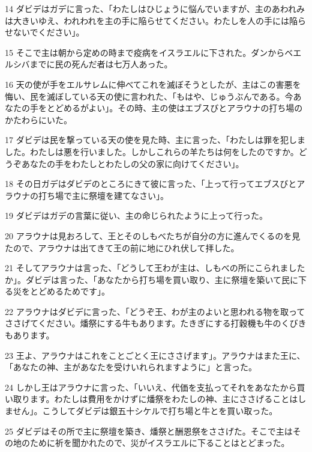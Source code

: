 \par 14 ダビデはガデに言った、「わたしはひじょうに悩んでいますが、主のあわれみは大きいゆえ、われわれを主の手に陥らせてください。わたしを人の手には陥らせないでください」。
\par 15 そこで主は朝から定めの時まで疫病をイスラエルに下された。ダンからベエルシバまでに民の死んだ者は七万人あった。
\par 16 天の使が手をエルサレムに伸べてこれを滅ぼそうとしたが、主はこの害悪を悔い、民を滅ぼしている天の使に言われた、「もはや、じゅうぶんである。今あなたの手をとどめるがよい」。その時、主の使はエブスびとアラウナの打ち場のかたわらにいた。
\par 17 ダビデは民を撃っている天の使を見た時、主に言った、「わたしは罪を犯しました。わたしは悪を行いました。しかしこれらの羊たちは何をしたのですか。どうぞあなたの手をわたしとわたしの父の家に向けてください」。
\par 18 その日ガデはダビデのところにきて彼に言った、「上って行ってエブスびとアラウナの打ち場で主に祭壇を建てなさい」。
\par 19 ダビデはガデの言葉に従い、主の命じられたように上って行った。
\par 20 アラウナは見おろして、王とそのしもべたちが自分の方に進んでくるのを見たので、アラウナは出てきて王の前に地にひれ伏して拝した。
\par 21 そしてアラウナは言った、「どうして王わが主は、しもべの所にこられましたか」。ダビデは言った、「あなたから打ち場を買い取り、主に祭壇を築いて民に下る災をとどめるためです」。
\par 22 アラウナはダビデに言った、「どうぞ王、わが主のよいと思われる物を取ってささげてください。燔祭にする牛もあります。たきぎにする打穀機も牛のくびきもあります。
\par 23 王よ、アラウナはこれをことごとく王にささげます」。アラウナはまた王に、「あなたの神、主があなたを受けいれられますように」と言った。
\par 24 しかし王はアラウナに言った、「いいえ、代価を支払ってそれをあなたから買い取ります。わたしは費用をかけずに燔祭をわたしの神、主にささげることはしません」。こうしてダビデは銀五十シケルで打ち場と牛とを買い取った。
\par 25 ダビデはその所で主に祭壇を築き、燔祭と酬恩祭をささげた。そこで主はその地のために祈を聞かれたので、災がイスラエルに下ることはとどまった。


